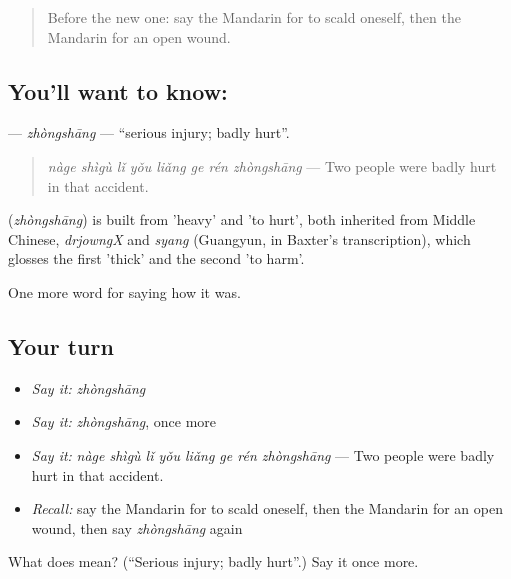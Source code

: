 \label{lesson:ZH-C478-zhongshang}



\begin{quote}
Before the new one: say the Mandarin for to scald oneself, then the Mandarin for an open wound.
\end{quote}

\subsection*{You'll want to know: }
\textbf{} — \emph{zhòngshāng} — \textquotedblleft{}serious injury; badly hurt\textquotedblright{}.

\begin{quote}
\textbf{} \emph{nàge shìgù lǐ yǒu liǎng ge rén zhòngshāng} — Two people were badly hurt in that accident.
\end{quote}

\begin{cousinweb}
\textbf{} (\emph{zhòngshāng}) is built from  'heavy' and  'to hurt', both inherited from Middle Chinese, \emph{drjowngX} and \emph{syang} (Guangyun, in Baxter's transcription), which glosses the first 'thick' and the second 'to harm'.
\end{cousinweb}

\begin{grammarlens}[title={What you've built}]
One more word for saying how it was.
\end{grammarlens}

\subsection*{Your turn}
\begin{itemize}
\raggedright
  \item \emph{Say it:} \emph{zhòngshāng}
  \item \emph{Say it:} \emph{zhòngshāng}, once more
  \item \emph{Say it:} \emph{nàge shìgù lǐ yǒu liǎng ge rén zhòngshāng} — Two people were badly hurt in that accident.
  \item \emph{Recall:} say the Mandarin for to scald oneself, then the Mandarin for an open wound, then say \emph{zhòngshāng} again
\end{itemize}

\begin{tcolorbox}[breakable,colback=teal!4,colframe=teal!35!black,title={Before you move on}]
What does  mean? (\textquotedblleft{}Serious injury; badly hurt\textquotedblright{}.) Say it once more.
\end{tcolorbox}

